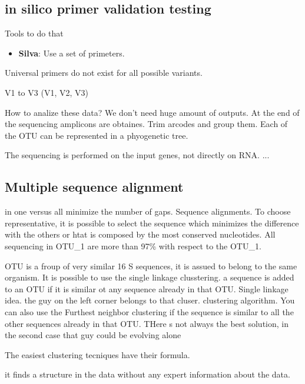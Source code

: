 \subsection{in silico primer validation testing}
Tools to do that

\begin{itemize}
\item \textbf{Silva}: Use a set of primeters.
\end{itemize}

Universal primers do not exist for all possible variants.



V1 to V3 (V1, V2, V3)

How to analize these data?
We don't need huge amount of outputs. At the end of the sequencing amplicons are obtaines. Trim arcodes and group them. Each of the OTU can be represented in a phyogenetic tree.

The sequencing is performed on the input genes, not directly on RNA. ...

\subsection{Multiple sequence alignment}
in one versus all minimize the number of gaps. Sequence alignments. To choose representative, it is possible to select the sequence which minimizes the difference with the others or htat is composed by the most conserved nucleotides. All sequencing in OTU_1 are more than 97\% with respect to the OTU_1.

OTU is a froup of very similar 16 S sequences, it is assued to belong to the same organism. It is possible to use the single linkage clusstering. a sequence is added to an OTU if it is similar ot any sequence already in that OTU. Single linkage idea. the guy on the left corner belongs to that cluser. clustering algorithm. You can also use the Furthest neighbor clustering if the sequence is similar to all the other sequences already in that OTU. THere s not always the best solution, in the second case that guy could be evolving alone

The easiest clustering tecniques have their formula. 


it finds a structure in the data without any expert information about the data. 

